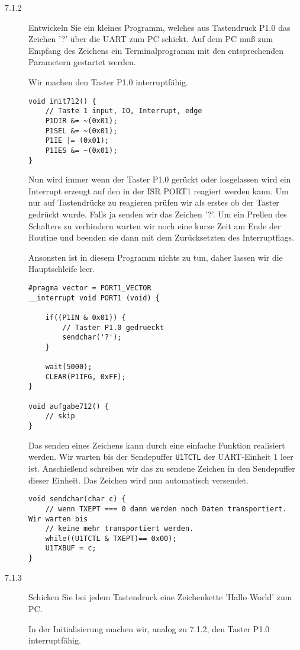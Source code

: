 \documentclass[11pt,a4paper,ngerman]{article}
\begin{document}
\begin{description}
\item[7.1.2] Entwickeln Sie ein kleines Programm, welches aus Tastendruck P1.0 das Zeichen '?' über die UART zum PC schickt. Auf dem PC muß zum Empfang des Zeichens ein Terminalprogramm mit den entsprechenden Parametern gestartet werden.

Wir machen den Taster P1.0 interruptfähig.
\begin{lstlisting}
void init712() {
    // Taste 1 input, IO, Interrupt, edge
    P1DIR &= ~(0x01);
    P1SEL &= ~(0x01);
    P1IE |= (0x01);
    P1IES &= ~(0x01);
}
\end{lstlisting}

Nun wird immer wenn der Taster P1.0 gerückt oder losgelassen wird ein Interrupt erzeugt auf den
in der ISR PORT1 reagiert werden kann. Um nur auf Tastendrücke zu reagieren
prüfen wir als erstes ob der Taster gedrückt wurde. Falls ja senden wir das Zeichen '?'.
Um ein Prellen des Schalters zu verhindern warten wir noch eine kurze Zeit am Ende der Routine und
beenden sie dann mit dem Zurücksetzten des Interruptflags.

Ansonsten ist in diesem Programm nichts zu tun, daher lassen wir die Hauptschleife leer.
\begin{lstlisting}
#pragma vector = PORT1_VECTOR
__interrupt void PORT1 (void) {

	if((P1IN & 0x01)) {
		// Taster P1.0 gedrueckt
		sendchar('?');
	}

	wait(5000);
	CLEAR(P1IFG, 0xFF);
}

void aufgabe712() {
	// skip
}
\end{lstlisting}

Das senden eines Zeichens kann durch eine einfache Funktion realisiert werden.
Wir warten bis der Sendepuffer \lstinline|U1TCTL| der UART-Einheit 1 leer ist. Anschießend schreiben wir
das zu sendene Zeichen in den Sendepuffer dieser Einheit. Das Zeichen wird nun automatisch versendet.
\begin{lstlisting}
void sendchar(char c) {
	// wenn TXEPT === 0 dann werden noch Daten transportiert. Wir warten bis
	// keine mehr transportiert werden.
	while((U1TCTL & TXEPT)== 0x00);
	U1TXBUF = c;
}
\end{lstlisting}

\item[7.1.3] Schicken Sie bei jedem Tastendruck eine Zeichenkette 'Hallo World' zum PC.

In der Initialisierung machen wir, analog zu 7.1.2, den Taster P1.0 interruptfähig.


\end{description}
\end{document}

